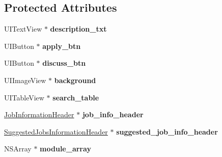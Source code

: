 \subsection*{\-Protected \-Attributes}
\begin{DoxyCompactItemize}
\item 
\hypertarget{interface_job_detail_screen_a1524d4f75a07cb3f69060bc212bd5c65}{
\-U\-I\-Text\-View $\ast$ {\bfseries description\-\_\-txt}}
\label{interface_job_detail_screen_a1524d4f75a07cb3f69060bc212bd5c65}

\item 
\hypertarget{interface_job_detail_screen_ad8d7990b9f9e302159393a2d6caaf4d2}{
\-U\-I\-Button $\ast$ {\bfseries apply\-\_\-btn}}
\label{interface_job_detail_screen_ad8d7990b9f9e302159393a2d6caaf4d2}

\item 
\hypertarget{interface_job_detail_screen_ac0f6c9ad01d1a8f9fe7a715b402de2e8}{
\-U\-I\-Button $\ast$ {\bfseries discuss\-\_\-btn}}
\label{interface_job_detail_screen_ac0f6c9ad01d1a8f9fe7a715b402de2e8}

\item 
\hypertarget{interface_job_detail_screen_aa67f42625935e1ae42f254a8d749d2a4}{
\-U\-I\-Image\-View $\ast$ {\bfseries background}}
\label{interface_job_detail_screen_aa67f42625935e1ae42f254a8d749d2a4}

\item 
\hypertarget{interface_job_detail_screen_a1b1d2951f28c514829b6c7d942d30f9e}{
\-U\-I\-Table\-View $\ast$ {\bfseries search\-\_\-table}}
\label{interface_job_detail_screen_a1b1d2951f28c514829b6c7d942d30f9e}

\item 
\hypertarget{interface_job_detail_screen_ac4861dfaa7e727b9d006b56ea19a7489}{
\hyperlink{interface_job_information_header}{\-Job\-Information\-Header} $\ast$ {\bfseries job\-\_\-info\-\_\-header}}
\label{interface_job_detail_screen_ac4861dfaa7e727b9d006b56ea19a7489}

\item 
\hypertarget{interface_job_detail_screen_ad8471428e25be7f57594bd27e9fd3f85}{
\hyperlink{interface_suggested_jobs_information_header}{\-Suggested\-Jobs\-Information\-Header} $\ast$ {\bfseries suggested\-\_\-job\-\_\-info\-\_\-header}}
\label{interface_job_detail_screen_ad8471428e25be7f57594bd27e9fd3f85}

\item 
\hypertarget{interface_job_detail_screen_ac7af6e062b429dd8e6a7260b12647f6c}{
\-N\-S\-Array $\ast$ {\bfseries module\-\_\-array}}
\label{interface_job_detail_screen_ac7af6e062b429dd8e6a7260b12647f6c}


\end{DoxyCompactItemize}
